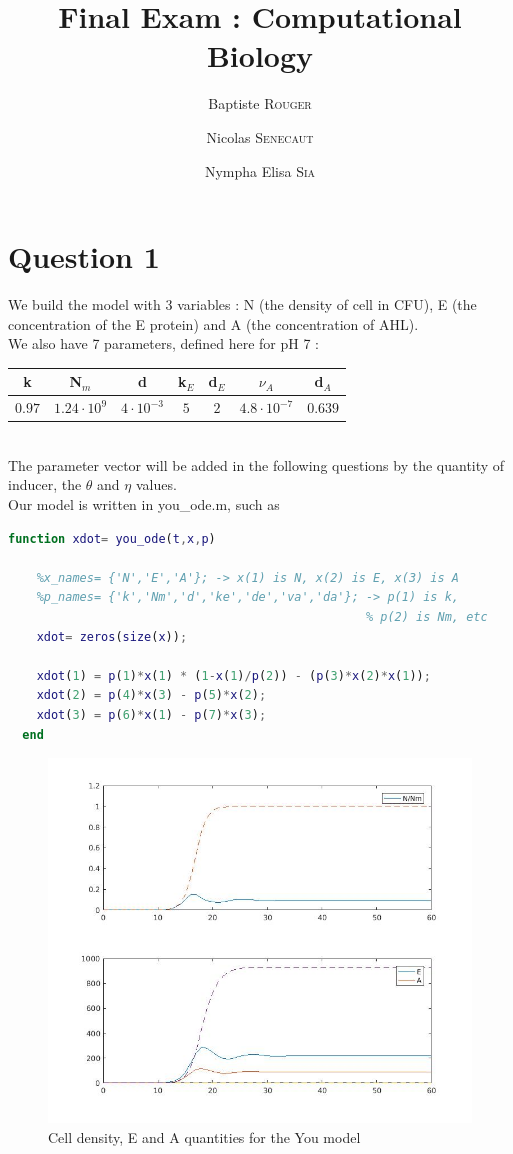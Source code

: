 \documentclass[11pt,a4paper]{report}
\author{Baptiste \textsc{Rouger} \and Nicolas \textsc{Senecaut} \and Nympha Elisa \textsc{Sia}}
\title{Final Exam : Computational Biology}
\begin{document}
\maketitle

\section*{Question 1}

We build the model with 3 variables : N (the density of cell in CFU), E (the concentration of the E protein) and A (the concentration of AHL).\\

\noindent We also have 7 parameters, defined here for pH 7 : \\
\begin{center}
\begin{tabular}{|c|c|c|c|c|c|c|}
\hline
k & N$_m$ & d & k$_E$ & d$_E$ & $\nu_A$ & d$_A$ \\
\hline
$0.97$ & $1.24 \cdot 10^9$ & $4 \cdot 10^{-3}$ & $5$ & $2$ & $4.8\cdot 10^{-7}$ & $0.639$ \\
\hline
\end{tabular}
\end{center}
~\\
The parameter vector will be added in the following questions by the quantity of inducer, the $\theta$ and $\eta$ values.\\

Our model is written in you\_ode.m, such as
\begin{lstlisting}[language=MatLab]
  function xdot= you_ode(t,x,p)

    %x_names= {'N','E','A'}; -> x(1) is N, x(2) is E, x(3) is A
    %p_names= {'k','Nm','d','ke','de','va','da'}; -> p(1) is k,
                                                  % p(2) is Nm, etc
    xdot= zeros(size(x));

    xdot(1) = p(1)*x(1) * (1-x(1)/p(2)) - (p(3)*x(2)*x(1));
    xdot(2) = p(4)*x(3) - p(5)*x(2);
    xdot(3) = p(6)*x(1) - p(7)*x(3);
  end
\end{lstlisting}

\begin{figure}[!ht]
  \begin{center}
    \includegraphics[width=0.7\linewidth]{Figure1.jpg}
    \caption{Cell density, E and A quantities for the You model}
    \label{q1}
  \end{center}
\end{figure}
\end{document}

